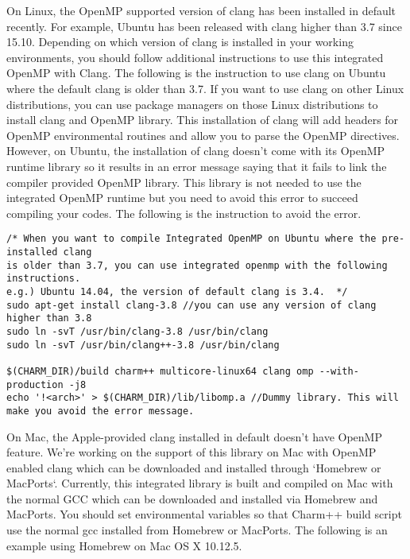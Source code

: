 On Linux, the OpenMP supported version of clang has been installed in default recently. For example, 
Ubuntu has been released with clang higher than 3.7 since 15.10.
Depending on which version of clang is installed in your working environments, you should follow additional instructions
to use this integrated OpenMP with Clang. The following is the instruction to use 
clang on Ubuntu where the default clang is older than 3.7. If you want to use clang on other Linux 
distributions, you can use package managers on those Linux distributions to install clang and OpenMP library. 
This installation of clang will add headers for OpenMP environmental routines and allow you to parse the OpenMP directives.
However, on Ubuntu, the installation of clang doesn't come with its OpenMP runtime library so it results in an error message saying that
it fails to link the compiler provided OpenMP library. This library is not needed to use the integrated OpenMP runtime but you
need to avoid this error to succeed compiling your codes. The following is the instruction to avoid the error. 

\begin{verbatim}
/* When you want to compile Integrated OpenMP on Ubuntu where the pre-installed clang
is older than 3.7, you can use integrated openmp with the following instructions.
e.g.) Ubuntu 14.04, the version of default clang is 3.4.  */
sudo apt-get install clang-3.8 //you can use any version of clang higher than 3.8
sudo ln -svT /usr/bin/clang-3.8 /usr/bin/clang
sudo ln -svT /usr/bin/clang++-3.8 /usr/bin/clang

$(CHARM_DIR)/build charm++ multicore-linux64 clang omp --with-production -j8 
echo '!<arch>' > $(CHARM_DIR)/lib/libomp.a //Dummy library. This will make you avoid the error message.
\end{verbatim}

On Mac, the Apple-provided clang installed in default doesn't have OpenMP feature. We're working on the support of 
this library on Mac with OpenMP enabled clang which can be downloaded and installed through `Homebrew or MacPorts`.
Currently, this integrated library is built and compiled on Mac with the normal GCC which can be downloaded and 
installed via Homebrew and MacPorts. You should set environmental variables so that Charm++ build script use the
normal gcc installed from Homebrew or MacPorts. The following is an example using Homebrew on Mac OS X 10.12.5.

